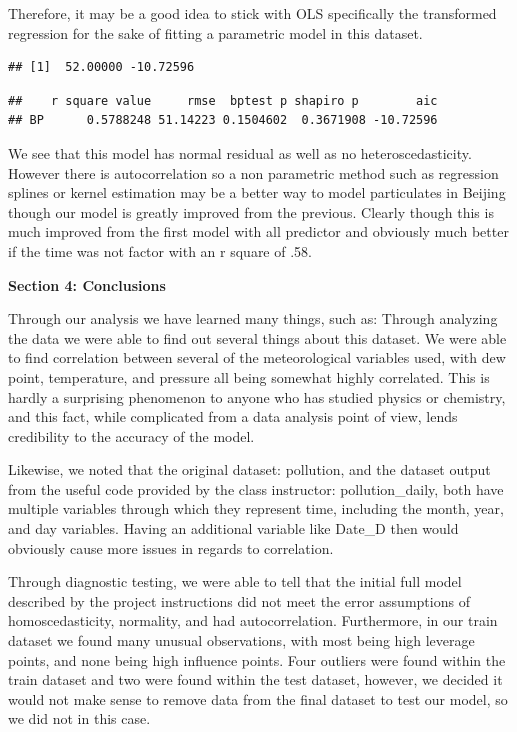 \documentclass[
]{report}
\begin{document}
Therefore, it may be a good idea to stick with OLS specifically the
transformed regression for the sake of fitting a parametric model in
this dataset.

\begin{verbatim}
## [1]  52.00000 -10.72596
\end{verbatim}

\begin{verbatim}
##    r square value     rmse  bptest p shapiro p        aic
## BP      0.5788248 51.14223 0.1504602  0.3671908 -10.72596
\end{verbatim}

We see that this model has normal residual as well as no
heteroscedasticity. However there is autocorrelation so a non parametric
method such as regression splines or kernel estimation may be a better
way to model particulates in Beijing though our model is greatly
improved from the previous. Clearly though this is much improved from
the first model with all predictor and obviously much better if the time
was not factor with an r square of .58.

\textbf{Section 4: Conclusions}

Through our analysis we have learned many things, such as: Through
analyzing the data we were able to find out several things about this
dataset. We were able to find correlation between several of the
meteorological variables used, with dew point, temperature, and pressure
all being somewhat highly correlated. This is hardly a surprising
phenomenon to anyone who has studied physics or chemistry, and this
fact, while complicated from a data analysis point of view, lends
credibility to the accuracy of the model.

Likewise, we noted that the original dataset: pollution, and the dataset
output from the useful code provided by the class instructor:
pollution\_daily, both have multiple variables through which they
represent time, including the month, year, and day variables. Having an
additional variable like Date\_D then would obviously cause more issues
in regards to correlation.

Through diagnostic testing, we were able to tell that the initial full
model described by the project instructions did not meet the error
assumptions of homoscedasticity, normality, and had autocorrelation.
Furthermore, in our train dataset we found many unusual observations,
with most being high leverage points, and none being high influence
points. Four outliers were found within the train dataset and two were
found within the test dataset, however, we decided it would not make
sense to remove data from the final dataset to test our model, so we did
not in this case.
\end{document}
